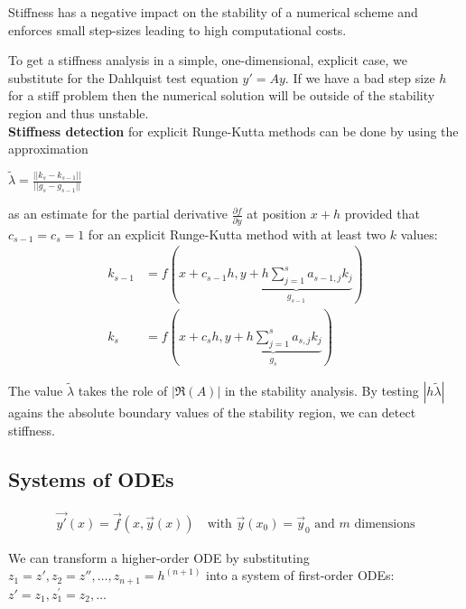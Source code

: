 Stiffness has a negative impact on the stability of a numerical scheme and enforces small step-sizes
leading to high computational costs.

To get a stiffness analysis in a simple, one-dimensional, explicit case, we substitute
 for the Dahlquist test equation $y'=Ay$.
If we have a bad step size $h$ for a stiff problem then the numerical solution will be outside
of the stability region and thus unstable.
\\[1em]
\textbf{Stiffness detection} for explicit Runge-Kutta methods can be done by using the
approximation

\colorbox{shadecolor}{$
    \displaystyle
    \tilde{\lambda} = \frac{||k_s - k_{s-1}||}{||g_s - g_{s-1}||}
$}

as an estimate for the partial derivative $\frac{\partial f}{\partial y}$ at position $x+h$ provided
that $c_{s-1} = c_s = 1$ for an explicit Runge-Kutta method with at least two $k$ values:
\begin{align*}
    k_{s-1}
    & = f(x+c_{s-1}h,\underbrace{y+h\sum_{j=1}^{s}a_{s-1,j}k_{j}}_{g_{s-1}}) \\
    k_{s}
    & =f(x+c_{s}h,\underbrace{y+h\sum_{j=1}^{s}a_{s,j}k_{j}}_{g_{s}})
\end{align*}

The value $\tilde{\lambda}$ takes the role of $|\Re(A)|$ in the stability analysis.
By testing $|h\tilde\lambda|$ agains the absolute boundary values of the stability region,
we can detect stiffness.

\subsection{Systems of ODEs}
\begin{align*}
    {\vec{y'}}(x)={\vec{f}}(x,{\vec{y}}(x))\quad\text{with }{\vec{y}}(x_0)={\vec{y}}_0\text{ and }m\text{ dimensions}
\end{align*}

We can transform a higher-order ODE by substituting $z_1 = z', z_2 = z'', \ldots, z_{n+1} = h^{(n+1)}$
into a system of first-order ODEs: $z' = z_1, z_1^\prime = z_2, \ldots$
